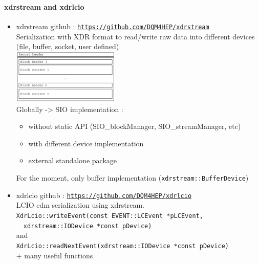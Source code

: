 \documentclass[8pt]{beamer}
\begin{document}
  \begin{frame}[containsverbatim]
  \frametitle{\secname}
  \framesubtitle{xdrstream and xdrlcio}

  \begin{itemize}
    \item xdrstream github : \href{https://github.com/DQM4HEP/xdrstream}{\tt https://github.com/DQM4HEP/xdrstream} \\
    Serialization with XDR format to read/write raw data into different devices (file, buffer, socket, user defined) \\
    \includegraphics[width=0.4\textwidth]{figs/xdrstream_structure.pdf} \\
    Globally -> SIO implementation :
    \begin{itemize}
      \item without static API (SIO\_blockManager, SIO\_streamManager, etc)
      \item with different device implementation
      \item external standalone package
    \end{itemize}
    For the moment, only buffer implementation (\verb|xdrstream::BufferDevice|)
    \item xdrlcio github : \href{https://github.com/DQM4HEP/xdrlcio}{\tt https://github.com/DQM4HEP/xdrlcio} \\
    LCIO edm serialization using xdrstream. \\
    \textbullet \verb|XdrLcio::writeEvent(const EVENT::LCEvent *pLCEvent,|\\
    ~~\verb|xdrstream::IODevice *const pDevice)| \\
    and \\
    \textbullet \verb|XdrLcio::readNextEvent(xdrstream::IODevice *const pDevice)| \\
    + many useful functions
  \end{itemize}





  \end{frame}
\end{document}
